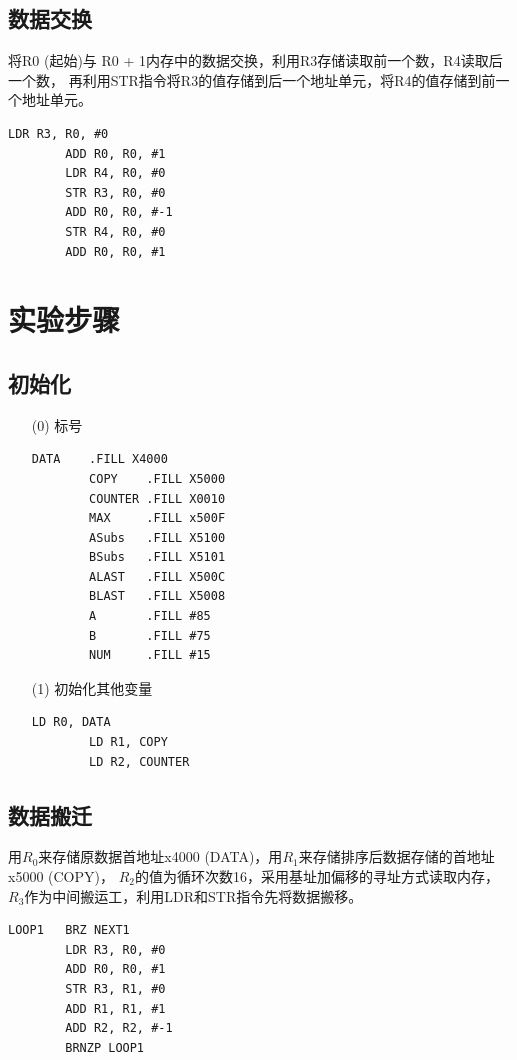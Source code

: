 \documentclass[UTF8]{ctexart}
\begin{document}
    \clearpage
    \subsection{数据交换}
    将R0 (起始)与 R0 + 1内存中的数据交换，利用R3存储读取前一个数，R4读取后一个数，
    再利用STR指令将R3的值存储到后一个地址单元，将R4的值存储到前一个地址单元。
    \begin{lstlisting}[basicstyle=\ttfamily,language={[x86masm]Assembler}]
        LDR R3, R0, #0
        ADD R0, R0, #1
        LDR R4, R0, #0
        STR R3, R0, #0
        ADD R0, R0, #-1
        STR R4, R0, #0
        ADD R0, R0, #1
    \end{lstlisting}


\section{实验步骤}
\subsection{初始化}
\begin{enumerate}
    \item [(0)]标号
    \begin{lstlisting}[basicstyle=\ttfamily,language={[x86masm]Assembler}]
        DATA	.FILL X4000
        COPY	.FILL X5000
        COUNTER	.FILL X0010
        MAX     .FILL x500F
        ASubs	.FILL X5100
        BSubs 	.FILL X5101
        ALAST	.FILL X500C
        BLAST	.FILL X5008
        A	    .FILL #85
        B	    .FILL #75
        NUM	    .FILL #15
    \end{lstlisting}

    \item [(1)]初始化其他变量
    \begin{lstlisting}[basicstyle=\ttfamily,language={[x86masm]Assembler}]
        LD R0, DATA
    	LD R1, COPY
    	LD R2, COUNTER
    \end{lstlisting}
\end{enumerate}

\clearpage
\subsection{数据搬迁}
    用$R_0$来存储原数据首地址x4000 (DATA)，用$R_1$来存储排序后数据存储的首地址x5000 (COPY)，
    $R_2$的值为循环次数16，采用基址加偏移的寻址方式读取内存，$R_3$作为中间搬运工，利用LDR和STR指令先将数据搬移。
    \begin{lstlisting}[basicstyle=\ttfamily,language={[x86masm]Assembler}]
        LOOP1	BRZ NEXT1
    	LDR R3, R0, #0
    	ADD R0, R0, #1
    	STR R3, R1, #0
    	ADD R1, R1, #1
    	ADD R2, R2, #-1
    	BRNZP LOOP1
    \end{lstlisting}
\end{document}
